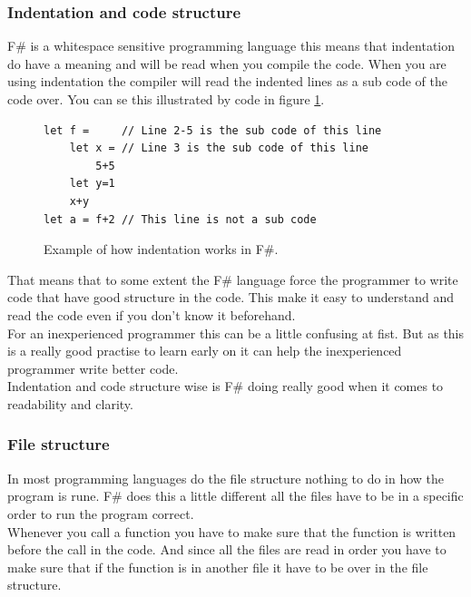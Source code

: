 \documentclass[12pt, a4paper]{article}
\begin{document}
\newpage
\subsubsection{Indentation and code structure}
F\# is a whitespace sensitive programming language this means that indentation do have a meaning and will be read when you compile the code. When you are using indentation the compiler will read the indented lines as a sub code of the code over. You can se this illustrated by code in figure \ref{fig:indentationExample}.

\begin{figure}[!h]
	\begin{lstlisting}
let f = 	// Line 2-5 is the sub code of this line
	let x = // Line 3 is the sub code of this line
		5+5	
	let y=1
  	x+y
let a = f+2	// This line is not a sub code
	\end{lstlisting}
	\caption{Example of how indentation works in F\#.}
	\label{fig:indentationExample}
\end{figure}

That means that to some extent the F\# language force the programmer to write code that have good structure in the code. This make it easy to understand and read the code even if you don't know it beforehand.\\

For an inexperienced programmer this can be a little confusing at fist. But as this is a really good practise to learn early on it can help the inexperienced programmer write better code.\\

Indentation and code structure wise is F\# doing really good when it comes to readability and clarity.

\newpage
\subsubsection{File structure}

In most programming languages do the file structure nothing to do in how the program is rune. F\# does this a little different all the files have to be in a specific order to run the program correct.\\

Whenever you call a function you have to make sure that the function is written before the call in the code. And since all the files are read in order you have to make sure that if the function is in another file it have to be over in the file structure.\\
\end{document}
